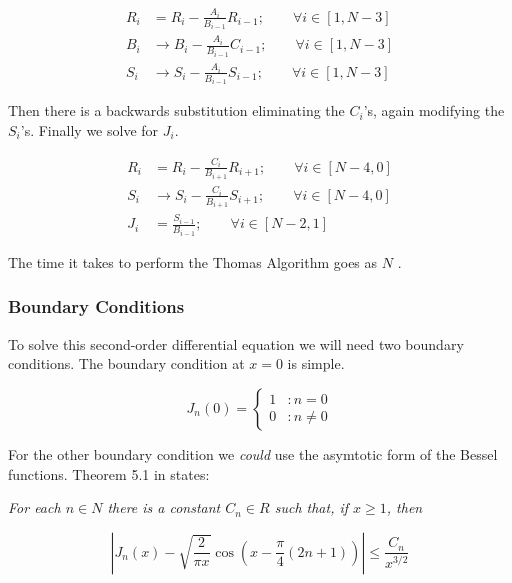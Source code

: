 \documentclass[onecolumn, groupedaddress, 10pt]{revtex4-1}
\begin{document}
\begin{align}
R_i &=   R_i - \frac{A_i}{B_{i-1}} R_{i-1}; 	\qquad \forall i \in [1, N-3]		\\
B_i &\to B_i - \frac{A_i}{B_{i-1}} C_{i-1}; 	\qquad \forall i \in [1, N-3]		\\
S_i &\to S_i - \frac{A_i}{B_{i-1}} S_{i-1}; 	\qquad \forall i \in [1, N-3]
\end{align}

Then there is a backwards substitution eliminating the $C_i$'s, again modifying the $S_i$'s.  Finally we solve for $J_i$.

\begin{align}
R_i &=   R_i - \frac{C_i}{B_{i+1}} R_{i+1}; \qquad \forall i \in [N-4, 0]	\\
S_i &\to S_i - \frac{C_i}{B_{i+1}} S_{i+1}; \qquad \forall i \in [N-4, 0]	\\
J_i &=   \frac{S_{i-1}}{B_{i-1}};           \qquad \forall i \in [N-2, 1]
\end{align}

The time it takes to perform the Thomas Algorithm goes as $N$ \cite{}.



\subsubsection{Boundary Conditions \label{sec:boundaryConditions}}

To solve this second-order differential equation we will need two boundary conditions.  The boundary condition at $x=0$ is simple.

\begin{displaymath}
   J_n(0) = \left\{
     \begin{array}{lr}
       1 & : n = 0     \\
       0 & : n \neq 0
     \end{array}
   \right.
\end{displaymath}

For the other boundary condition we \textit{could} use the asymtotic form of the Bessel functions.  Theorem 5.1 in \cite{folland} states:

\textit{For each $n \in N$ there is a constant $C_n \in R$ such that, if $x \geq 1$, then}

\begin{equation}
\label{eqn:asymtoticBessel}
\left| J_n(x) - \sqrt{\frac{2}{\pi x}} \cos \left( x - \frac{\pi}{4} (2n+1) \right) \right| \leq \frac{C_n}{x^{3/2}}
\end{equation}
\end{document}
